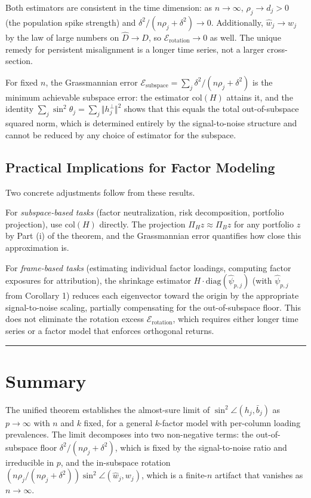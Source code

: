 \documentclass{article}
\theoremstyle{remark}
\begin{document}
Both estimators are consistent in the time dimension: as $n \to \infty$, $\rho_j \to d_j > 0$ (the population spike strength) and $\delta^2/(n\rho_j + \delta^2) \to 0$. Additionally, $\hat{w}_j \to w_j$ by the law of large numbers on $\hat{D} \to D$, so $\mathcal{E}_{\mathrm{rotation}} \to 0$ as well. The unique remedy for persistent misalignment is a longer time series, not a larger cross-section.

For fixed $n$, the Grassmannian error $\mathcal{E}_{\mathrm{subspace}} = \sum_j \delta^2/(n\rho_j + \delta^2)$ is the minimum achievable subspace error: the estimator $\mathrm{col}(H)$ attains it, and the identity $\sum_j\sin^2\theta_j = \sum_j\Vert h_j^\perp\Vert^2$ shows that this equals the total out-of-subspace squared norm, which is determined entirely by the signal-to-noise structure and cannot be reduced by any choice of estimator for the subspace.

\subsection{Practical Implications for Factor Modeling}

Two concrete adjustments follow from these results.

For \textit{subspace-based tasks} (factor neutralization, risk decomposition, portfolio projection), use $\mathrm{col}(H)$ directly. The projection $\Pi_H z \approx \Pi_B z$ for any portfolio $z$ by Part (i) of the theorem, and the Grassmannian error quantifies how close this approximation is.

For \textit{frame-based tasks} (estimating individual factor loadings, computing factor exposures for attribution), the shrinkage estimator $H \cdot \mathrm{diag}(\hat{\psi}_{p,j})$ (with $\hat{\psi}_{p,j}$ from Corollary 1) reduces each eigenvector toward the origin by the appropriate signal-to-noise scaling, partially compensating for the out-of-subspace floor. This does not eliminate the rotation excess $\mathcal{E}_{\mathrm{rotation}}$, which requires either longer time series or a factor model that enforces orthogonal returns.

\medskip\noindent\rule{\linewidth}{0.4pt}\medskip

\section{Summary}

The unified theorem establishes the almost-sure limit of $\sin^2\angle(h_j, \bar{b}_j)$ as $p \to \infty$ with $n$ and $k$ fixed, for a general $k$-factor model with per-column loading prevalences. The limit decomposes into two non-negative terms: the out-of-subspace floor $\delta^2/(n\rho_j + \delta^2)$, which is fixed by the signal-to-noise ratio and irreducible in $p$, and the in-subspace rotation $(n\rho_j/(n\rho_j + \delta^2))\sin^2\angle(\hat{w}_j, w_j)$, which is a finite-$n$ artifact that vanishes as $n \to \infty$.
\end{document}
